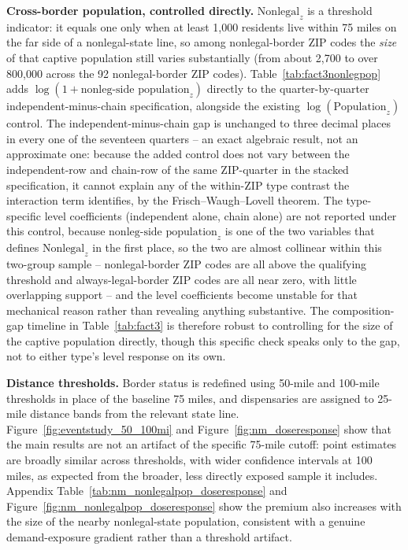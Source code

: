 \documentclass[english,12pt]{article}
\begin{document}
\textbf{Cross-border population, controlled directly.} $\text{Nonlegal}_z$ is a threshold indicator: it equals one only when at least 1,000 residents live within 75 miles on the far side of a nonlegal-state line, so among nonlegal-border ZIP codes the \emph{size} of that captive population still varies substantially (from about 2,700 to over 800,000 across the 92 nonlegal-border ZIP codes). Table~\ref{tab:fact3nonlegpop} adds $\log(1+\text{nonleg-side population}_z)$ directly to the quarter-by-quarter independent-minus-chain specification, alongside the existing $\log(\text{Population}_z)$ control. The independent-minus-chain gap is unchanged to three decimal places in every one of the seventeen quarters -- an exact algebraic result, not an approximate one: because the added control does not vary between the independent-row and chain-row of the same ZIP-quarter in the stacked specification, it cannot explain any of the within-ZIP type contrast the interaction term identifies, by the Frisch--Waugh--Lovell theorem. The type-specific level coefficients (independent alone, chain alone) are not reported under this control, because $\text{nonleg-side population}_z$ is one of the two variables that defines $\text{Nonlegal}_z$ in the first place, so the two are almost collinear within this two-group sample -- nonlegal-border ZIP codes are all above the qualifying threshold and always-legal-border ZIP codes are all near zero, with little overlapping support -- and the level coefficients become unstable for that mechanical reason rather than revealing anything substantive. The composition-gap timeline in Table~\ref{tab:fact3} is therefore robust to controlling for the size of the captive population directly, though this specific check speaks only to the gap, not to either type's level response on its own.

\begin{table}[htbp]
\centering\footnotesize

\caption{Independent-minus-chain gap, baseline versus adding $\log(1+\text{nonleg-side population}_z)$ as a direct control, by quarter. Same sample, stacked specification, and county-clustered standard errors as the ``Indep.\ $-$ chain'' column of Table~\ref{tab:fact3}. $^{*}p<.10$ $^{**}p<.05$ $^{***}p<.01$.}
\label{tab:fact3nonlegpop}
\end{table}

\textbf{Distance thresholds.} Border status is redefined using 50-mile and 100-mile thresholds in place of the baseline 75 miles, and dispensaries are assigned to 25-mile distance bands from the relevant state line. Figure~\ref{fig:eventstudy_50_100mi} and Figure~\ref{fig:nm_doseresponse} show that the main results are not an artifact of the specific 75-mile cutoff: point estimates are broadly similar across thresholds, with wider confidence intervals at 100 miles, as expected from the broader, less directly exposed sample it includes. Appendix Table~\ref{tab:nm_nonlegalpop_doseresponse} and Figure~\ref{fig:nm_nonlegalpop_doseresponse} show the premium also increases with the size of the nearby nonlegal-state population, consistent with a genuine demand-exposure gradient rather than a threshold artifact.
\end{document}
